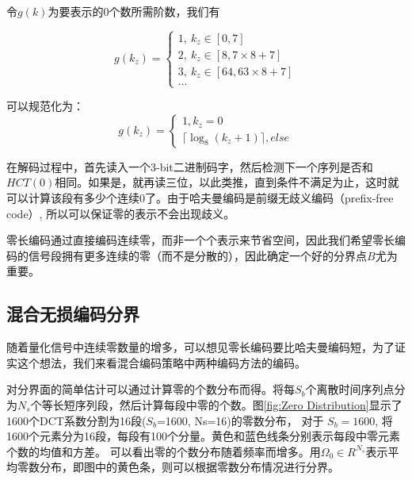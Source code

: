 令$g(k)$为要表示的0个数所需阶数，我们有


\begin{equation*}
  g(k_z)=\left\{
    \begin{array}{lr}
        1,\ k_z\in[0,7]\\
        2,\ k_z\in[8,7\times8+7]\\
        3,\ k_z\in[64,63\times8+7]\\
        \ldots
    \end{array}
  \right.
\end{equation*}


可以规范化为：
\begin{equation}\label{Eq:g(kz) definition}
  g(k_z)=\left\{
    \begin{array}{lr}
        1,k_z=0\\
        \lceil \log_8(k_z+1) \rceil,else
    \end{array}
  \right.
\end{equation}

在解码过程中，首先读入一个3-bit二进制码字，然后检测下一个序列是否和$HCT(0)$相同。如果是，就再读三位，以此类推，直到条件不满足为止，这时就可以计算该段有多少个连续0了。由于哈夫曼编码是前缀无歧义编码（prefix-free code）, 所以可以保证零的表示不会出现歧义。

零长编码通过直接编码连续零，而非一个个表示来节省空间，因此我们希望零长编码的信号段拥有更多连续的零（而不是分散的），因此确定一个好的分界点$B$尤为重要。








\subsection{混合无损编码分界}\label{sec:delimerate}
随着量化信号中连续零数量的增多，可以想见零长编码要比哈夫曼编码短，为了证实这个想法，我们来看混合编码策略中两种编码方法的编码。

对分界面的简单估计可以通过计算零的个数分布而得。将每$S_b$个离散时间序列点分为$N_s$个等长短序列段，然后计算每段中零的个数。图\ref{fig:Zero Distribution}显示了1600个DCT系数分割为16段($S_b$=1600, Ns=16)的零数分布， 对于 $S_b=1600$, 将1600个元素分为16段，每段有100个分量。黄色和蓝色线条分别表示每段中零元素个数的均值和方差。 可以看出零的个数分布随着频率而增多。用$\Omega_0\in R^{N_s}$表示平均零数分布，即图中的黄色条，则可以根据零数分布情况进行分界。

